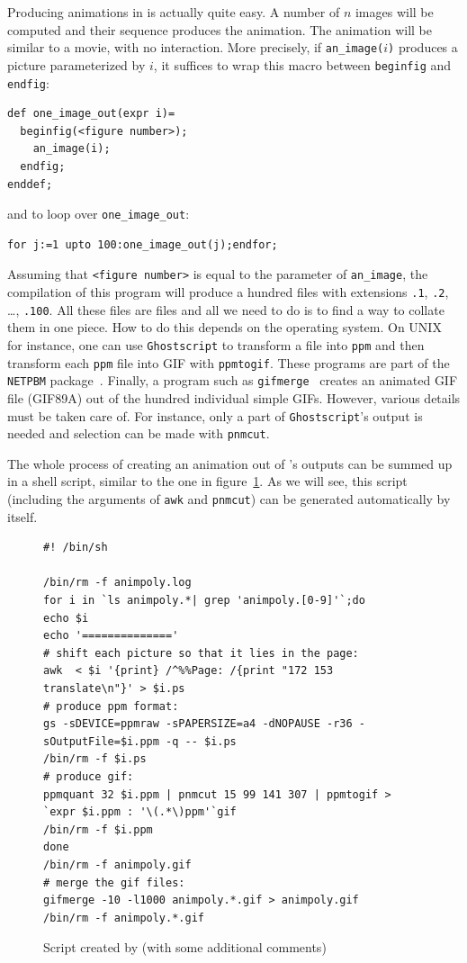 \documentclass[nonumber,harvardcite]{ltugboat}
\begin{document}
Producing animations in \MP{} is actually quite easy. A number of
$n$ images will be computed and their sequence produces the animation. 
The animation will be similar to a movie, with no interaction. More precisely, 
if \verb|an_image(|$i$\verb|)|
produces a picture parameterized by $i$, 
it suffices to wrap this macro
between \verb|beginfig| and \verb|endfig|:

\begin{verbatim}
def one_image_out(expr i)=
  beginfig(<figure number>);
    an_image(i);
  endfig;
enddef;
\end{verbatim}

\noindent and to loop over \verb|one_image_out|:

\begin{verbatim}
for j:=1 upto 100:one_image_out(j);endfor;
\end{verbatim}

Assuming that \verb|<figure number>| 
is equal to the parameter of \verb|an_image|, 
the compilation of this program will produce
a hundred files with extensions \verb|.1|, \verb|.2|, \ldots, \verb|.100|.
All these files are \PS{} files and all we need to do is to find a way
to collate them in one piece. How to do this depends on the operating
system. On UNIX for instance, one can use \texttt{Ghostscript} 
to transform a \PS{} file
into \texttt{ppm} and then transform each \texttt{ppm} file into
GIF with \texttt{ppmtogif}. These programs are part of the
\texttt{NETPBM} package~\cite{netpbm}. Finally, a program such as 
\texttt{gifmerge}~\cite{gifmerge}
creates an animated GIF file (GIF89A) 
out of the hundred individual simple GIFs.
However, various details must be taken care of. For instance,
only a part of \texttt{Ghostscript}'s output is needed
and selection can be made with \texttt{pnmcut}.

The whole process of creating an animation out of \MP's outputs can
be summed up in a shell script, similar to the one 
in figure~\ref{animation-script}. As we will see, this script (including
the arguments of \texttt{awk} and \texttt{pnmcut}) can be generated 
automatically by \MP{} itself.

\begin{figure}
\begin{verbatim}
#! /bin/sh

/bin/rm -f animpoly.log
for i in `ls animpoly.*| grep 'animpoly.[0-9]'`;do
echo $i
echo '=============='
# shift each picture so that it lies in the page:
awk  < $i '{print} /^%%Page: /{print "172 153 translate\n"}' > $i.ps
# produce ppm format:
gs -sDEVICE=ppmraw -sPAPERSIZE=a4 -dNOPAUSE -r36 -sOutputFile=$i.ppm -q -- $i.ps
/bin/rm -f $i.ps
# produce gif:
ppmquant 32 $i.ppm | pnmcut 15 99 141 307 | ppmtogif > `expr $i.ppm : '\(.*\)ppm'`gif
/bin/rm -f $i.ppm
done
/bin/rm -f animpoly.gif
# merge the gif files:
gifmerge -10 -l1000 animpoly.*.gif > animpoly.gif
/bin/rm -f animpoly.*.gif
\end{verbatim}
\caption{Script created by \MP{} (with some additional comments)}
\label{animation-script}
\end{figure}
\end{document}
